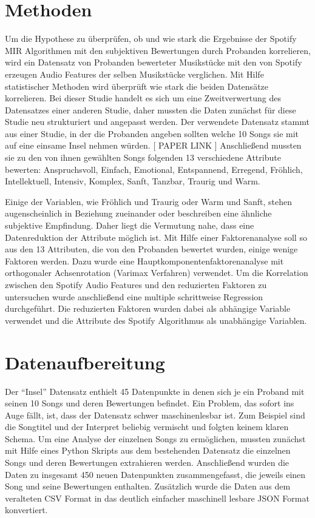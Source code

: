 \section*{Methoden}
\label{sec:Methoden}

Um die Hypothese zu überprüfen, ob und wie stark die Ergebnisse der Spotify MIR Algorithmen mit den subjektiven Bewertungen durch Probanden korrelieren, wird ein Datensatz von Probanden bewerteter Musikstücke mit den von Spotify erzeugen Audio Features der selben Musikstücke verglichen.
Mit Hilfe statistischer Methoden wird überprüft wie stark die beiden Datensätze korrelieren.
Bei dieser Studie handelt es sich um eine Zweitverwertung des Datensatzes einer anderen Studie, daher mussten die Daten zunächst für diese Studie neu strukturiert und angepasst werden.
Der verwendete Datensatz stammt aus einer Studie, in der die Probanden angeben sollten welche 10 Songs sie mit auf eine einsame Insel nehmen würden. [ PAPER LINK ]
Anschließend mussten sie zu den von ihnen gewählten Songs folgenden 13 verschiedene Attribute bewerten: Anspruchsvoll, Einfach, Emotional, Entspannend, Erregend, Fröhlich, Intellektuell, Intensiv, Komplex, Sanft, Tanzbar, Traurig und Warm.

Einige der Variablen, wie Fröhlich und Traurig oder Warm und Sanft, stehen augenscheinlich in Beziehung zueinander oder beschreiben eine ähnliche subjektive Empfindung.
Daher liegt die Vermutung nahe, dass eine Datenreduktion der Attribute möglich ist.
Mit Hilfe einer Faktorenanalyse soll so aus den 13 Attributen, die von den Probanden bewertet wurden, einige wenige Faktoren werden.
Dazu wurde eine Hauptkomponentenfaktorenanalyse mit orthogonaler Achsenrotation (Varimax Verfahren) verwendet.
Um die Korrelation zwischen den Spotify Audio Features und den reduzierten Faktoren zu untersuchen wurde anschließend eine multiple schrittweise Regression durchgeführt.
Die reduzierten Faktoren wurden dabei als abhängige Variable verwendet und die Attribute des Spotify Algorithmus als unabhängige Variablen.



\section*{Datenaufbereitung}
\label{sec:Datenaufbereitung}


Der "`Insel"' Datensatz enthielt 45 Datenpunkte in denen sich je ein Proband mit seinen 10 Songs und deren Bewertungen befindet.
Ein Problem, das sofort ins Auge fällt, ist, dass der Datensatz schwer maschinenlesbar ist. 
Zum Beispiel sind die Songtitel und der Interpret beliebig vermischt und folgten keinem klaren Schema.
Um eine Analyse der einzelnen Songs zu ermöglichen, mussten zunächst mit Hilfe eines Python Skripts aus dem bestehenden Datensatz die einzelnen Songs und deren Bewertungen extrahieren werden.
Anschließend wurden die Daten zu insgesamt 450 neuen Datenpunkten zusammengefasst, die jeweils einen Song und seine Bewertungen enthalten.
Zusätzlich wurde die Daten aus dem veralteten CSV Format in das deutlich einfacher maschinell lesbare JSON Format konvertiert.

